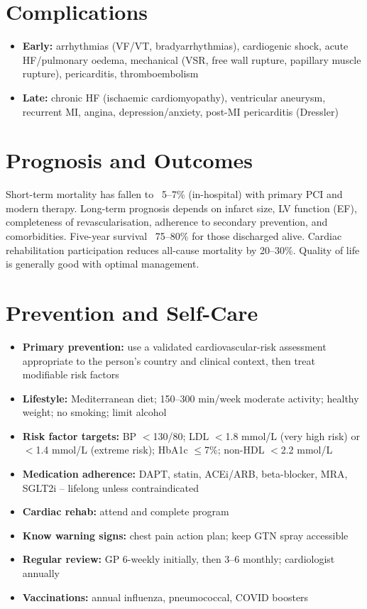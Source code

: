 \section*{Complications}
\begin{itemize}
    \item \textbf{Early:} arrhythmias (VF/VT, bradyarrhythmias), cardiogenic shock, acute HF/pulmonary oedema, mechanical (VSR, free wall rupture, papillary muscle rupture), pericarditis, thromboembolism
    \item \textbf{Late:} chronic HF (ischaemic cardiomyopathy), ventricular aneurysm, recurrent MI, angina, depression/anxiety, post-MI pericarditis (Dressler)
\end{itemize}

\section*{Prognosis and Outcomes}
Short-term mortality has fallen to ~5--7\% (in-hospital) with primary PCI and modern therapy. Long-term prognosis depends on infarct size, LV function (EF), completeness of revascularisation, adherence to secondary prevention, and comorbidities. Five-year survival ~75--80\% for those discharged alive. Cardiac rehabilitation participation reduces all-cause mortality by 20--30\%. Quality of life is generally good with optimal management.

\section*{Prevention and Self-Care}
\begin{itemize}
    \item \textbf{Primary prevention:} use a validated cardiovascular-risk assessment appropriate to the person's country and clinical context, then treat modifiable risk factors
    \item \textbf{Lifestyle:} Mediterranean diet; 150--300 min/week moderate activity; healthy weight; no smoking; limit alcohol
    \item \textbf{Risk factor targets:} BP $<$130/80; LDL $<$1.8 mmol/L (very high risk) or $<$1.4 mmol/L (extreme risk); HbA1c $\le$7\%; non-HDL $<$2.2 mmol/L
    \item \textbf{Medication adherence:} DAPT, statin, ACEi/ARB, beta-blocker, MRA, SGLT2i -- lifelong unless contraindicated
    \item \textbf{Cardiac rehab:} attend and complete program
    \item \textbf{Know warning signs:} chest pain action plan; keep GTN spray accessible
    \item \textbf{Regular review:} GP 6-weekly initially, then 3--6 monthly; cardiologist annually
    \item \textbf{Vaccinations:} annual influenza, pneumococcal, COVID boosters
\end{itemize}

